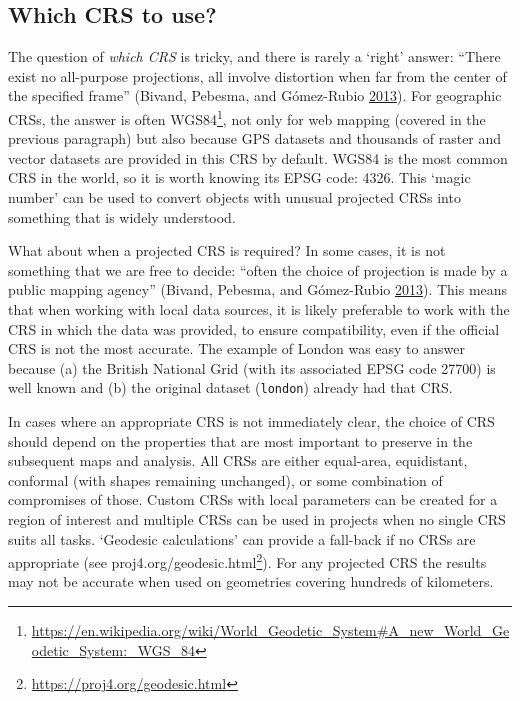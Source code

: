 \documentclass[]{krantz}
\let\rmarkdownfootnote\footnote%
\def\footnote{\protect\rmarkdownfootnote}
\renewcommand{\href}[2]{#2\footnote{\url{#1}}}
\begin{document}
\hypertarget{which-crs-to-use}{%
\subsection{Which CRS to use?}\label{which-crs-to-use}}

The question of \emph{which CRS} is tricky, and there is rarely a `right' answer:
``There exist no all-purpose projections, all involve distortion when far from the center of the specified frame'' (Bivand, Pebesma, and Gómez-Rubio \protect\hyperlink{ref-bivand_applied_2013}{2013}).
For geographic CRSs, the answer is often \href{https://en.wikipedia.org/wiki/World_Geodetic_System\#A_new_World_Geodetic_System:_WGS_84}{WGS84}, not only for web mapping (covered in the previous paragraph) but also because GPS datasets and thousands of raster and vector datasets are provided in this CRS by default.
WGS84 is the most common CRS in the world, so it is worth knowing its EPSG code: 4326.
This `magic number' can be used to convert objects with unusual projected CRSs into something that is widely understood.

What about when a projected CRS is required?
In some cases, it is not something that we are free to decide:
``often the choice of projection is made by a public mapping agency'' (Bivand, Pebesma, and Gómez-Rubio \protect\hyperlink{ref-bivand_applied_2013}{2013}).
This means that when working with local data sources, it is likely preferable to work with the CRS in which the data was provided, to ensure compatibility, even if the official CRS is not the most accurate.
The example of London was easy to answer because (a) the British National Grid (with its associated EPSG code 27700) is well known and (b) the original dataset (\texttt{london}) already had that CRS.

In cases where an appropriate CRS is not immediately clear, the choice of CRS should depend on the properties that are most important to preserve in the subsequent maps and analysis.
All CRSs are either equal-area, equidistant, conformal (with shapes remaining unchanged), or some combination of compromises of those.
Custom CRSs with local parameters can be created for a region of interest and multiple CRSs can be used in projects when no single CRS suits all tasks.
`Geodesic calculations' can provide a fall-back if no CRSs are appropriate (see \href{https://proj4.org/geodesic.html}{proj4.org/geodesic.html}).
For any projected CRS the results may not be accurate when used on geometries covering hundreds of kilometers.
\end{document}
